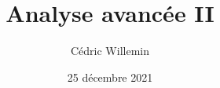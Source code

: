 \documentclass[a4paper,12pt]{book}%
\author{Cédric Willemin}
\title{Analyse avancée II}
\date{25 décembre 2021}
\begin{document}
\renewcommand{\figurename}{Figure} %
\renewcommand\listfigurename{Table des illustrations} %
\setlength\parindent{0pt} %

\tableofcontents
{}
\begin{center}
\vspace*{\fill}{\today}
\end{center}
\newpage

\pagestyle{fancy}
\setcounter{page}{1}


\end{document}
